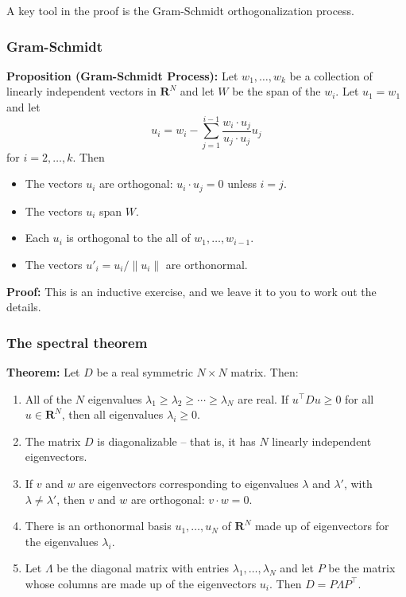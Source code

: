 \documentclass[
]{article}
\providecommand{\tightlist}{%
  \setlength{\itemsep}{0pt}\setlength{\parskip}{0pt}}
\begin{document}
A key tool in the proof is the Gram-Schmidt orthogonalization process.

\hypertarget{sec:gsprocess}{%
\subsubsection{Gram-Schmidt}\label{sec:gsprocess}}

\textbf{Proposition (Gram-Schmidt Process):} Let \(w_{1},\ldots, w_{k}\)
be a collection of linearly independent vectors in \(\mathbf{R}^{N}\)
and let \(W\) be the span of the \(w_{i}\). Let \(u_{1} = w_{1}\) and
let \[
u_{i} = w_{i} - \sum_{j=1}^{i-1} \frac{w_{i}\cdot u_{j}}{u_{j}\cdot u_{j}}u_{j}
\] for \(i=2,\ldots, k\). Then

\begin{itemize}
\tightlist
\item
  The vectors \(u_{i}\) are orthogonal: \(u_{i}\cdot u_{j}=0\) unless
  \(i=j\).
\item
  The vectors \(u_{i}\) span \(W\).
\item
  Each \(u_{i}\) is orthogonal to the all of \(w_{1},\ldots, w_{i-1}\).
\item
  The vectors \(u'_{i} = u_{i}/\|u_{i}\|\) are orthonormal.
\end{itemize}

\textbf{Proof:} This is an inductive exercise, and we leave it to you to
work out the details.

\hypertarget{the-spectral-theorem}{%
\subsubsection{The spectral theorem}\label{the-spectral-theorem}}

\textbf{Theorem:} Let \(D\) be a real symmetric \(N\times N\) matrix.
Then:

\begin{enumerate}
\def\labelenumi{\arabic{enumi}.}
\tightlist
\item
  All of the \(N\) eigenvalues
  \(\lambda_1\ge \lambda_2\ge \cdots \ge \lambda_{N}\) are real. If
  \(u^{\intercal}Du\ge 0\) for all \(u\in\mathbf{R}^{N}\), then all
  eigenvalues \(\lambda_{i}\ge 0\).
\item
  The matrix \(D\) is diagonalizable -- that is, it has \(N\) linearly
  independent eigenvectors.
\item
  If \(v\) and \(w\) are eigenvectors corresponding to eigenvalues
  \(\lambda\) and \(\lambda'\), with \(\lambda\not=\lambda'\), then
  \(v\) and \(w\) are orthogonal: \(v\cdot w=0\).
\item
  There is an orthonormal basis \(u_{1},\ldots, u_{N}\) of
  \(\mathbf{R}^{N}\) made up of eigenvectors for the eigenvalues
  \(\lambda_{i}\).
\item
  Let \(\Lambda\) be the diagonal matrix with entries
  \(\lambda_{1},\ldots, \lambda_{N}\) and let \(P\) be the matrix whose
  columns are made up of the eigenvectors \(u_{i}\). Then
  \(D=P\Lambda P^{\intercal}\).
\end{enumerate}
\end{document}
